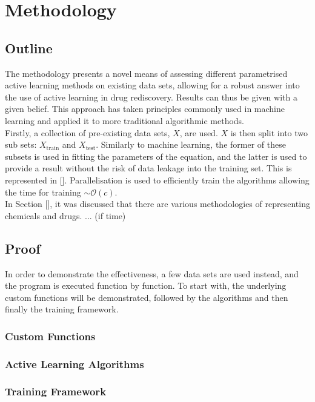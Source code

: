 \chapter{Methodology}


\graphicspath{{Chapter3/Figs/Vector/}{Chapter3/Figs/}}
\section{Outline}
The methodology presents a novel means of assessing different parametrised active learning methods on existing data sets, allowing for a robust answer into the use of active learning in drug rediscovery. Results can thus be given with a given belief. This approach has taken principles commonly used in machine learning and applied it to more traditional algorithmic methods.
\\
Firstly, a collection of pre-existing data sets, $X$, are used. $X$ is then split into two sub sets: $X_{\mathrm{train}}$ and $X_\mathrm{test}$. Similarly to machine learning, the former of these subsets is used in fitting the parameters of the equation, and the latter is used to provide a result without the risk of data leakage into the training set. This is represented in []. Parallelisation is used to efficiently train the algorithms allowing the time for training $\sim{}\mathcal{O}(c)$.
\\
In Section [], it was discussed that there are various methodologies of representing chemicals and drugs. ... (if time)
\section{Proof}
In order to demonstrate the effectiveness, a few data sets are used instead, and the program is executed function by function. To start with, the underlying custom functions will be demonstrated, followed by the algorithms and then finally the training framework.
\subsection{Custom Functions}
\blindtext[1]
\subsection{Active Learning Algorithms}
\blindtext[1]
\subsection{Training Framework}
\blindtext[1]
